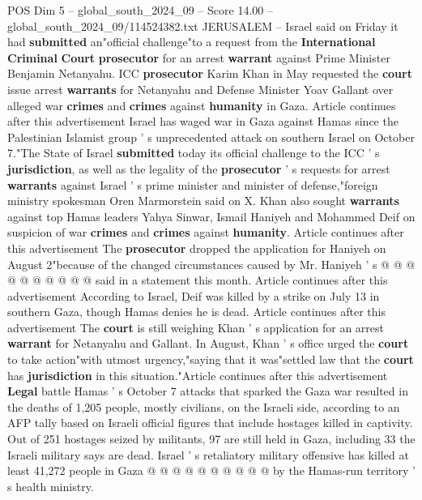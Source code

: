 \begin{textsample}{POS Dim 5 – global\_south\_2024\_09 – Score 14.00 – global\_south\_2024\_09/114524382.txt}  \label{ex:f5_pos_255}
JERUSALEM -- Israel said on Friday it had \textbf{submitted} an"official challenge"to a request from the \textbf{International} \textbf{Criminal} \textbf{Court} \textbf{prosecutor} for an arrest \textbf{warrant} against Prime Minister Benjamin Netanyahu.
ICC \textbf{prosecutor} Karim Khan in May requested the \textbf{court} issue arrest \textbf{warrants} for Netanyahu and Defense Minister Yoav Gallant over alleged war \textbf{crimes} and \textbf{crimes} against \textbf{humanity} in Gaza.
Article continues after this advertisement Israel has waged war in Gaza against Hamas since the Palestinian Islamist group ' s unprecedented attack on southern Israel on October 7."The State of Israel \textbf{submitted} today its official challenge to the ICC ' s \textbf{jurisdiction}, as well as the legality of the \textbf{prosecutor} ' s requests for arrest \textbf{warrants} against Israel ' s prime minister and minister of defense,"foreign ministry spokesman Oren Marmorstein said on X.
Khan also sought \textbf{warrants} against top Hamas leaders Yahya Sinwar, Ismail Haniyeh and Mohammed Deif on suspicion of war \textbf{crimes} and \textbf{crimes} against \textbf{humanity}.
Article continues after this advertisement The \textbf{prosecutor} dropped the application for Haniyeh on August 2"because of the changed circumstances caused by Mr.
Haniyeh ' s @ @ @ @ @ @ @ @ @ @ said in a statement this month.
Article continues after this advertisement According to Israel, Deif was killed by a strike on July 13 in southern Gaza, though Hamas denies he is dead.
Article continues after this advertisement The \textbf{court} is still weighing Khan ' s application for an arrest \textbf{warrant} for Netanyahu and Gallant.
In August, Khan ' s office urged the \textbf{court} to take action"with utmost urgency,"saying that it was"settled law that the \textbf{court} has \textbf{jurisdiction} in this situation."Article continues after this advertisement \textbf{Legal} battle Hamas ' s October 7 attacks that sparked the Gaza war resulted in the deaths of 1,205 people, mostly civilians, on the Israeli side, according to an AFP tally based on Israeli official figures that include hostages killed in captivity.
Out of 251 hostages seized by militants, 97 are still held in Gaza, including 33 the Israeli military says are dead.
Israel ' s retaliatory military offensive has killed at least 41,272 people in Gaza @ @ @ @ @ @ @ @ @ @ by the Hamas-run territory ' s health ministry.

\end{textsample}
